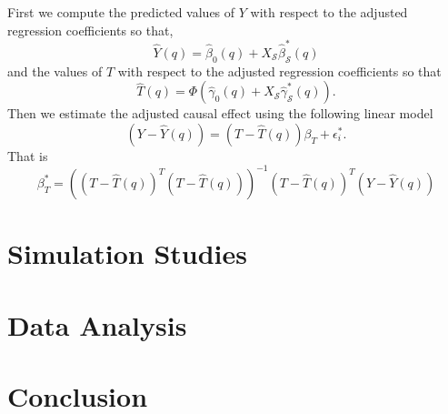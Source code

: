 \documentclass{amsart}
\begin{document}
First we compute the predicted values of $Y$ with respect to
the adjusted regression coefficients so that,
\begin{equation}
\hat{Y}(q) 
= \hat{\beta}_0(q) + X_{\mathcal{S}}\hat{\beta}^*_{\mathcal{S}}(q)
\end{equation}
and the values of $T$ with respect to the adjusted
regression coefficients so that
\begin{equation}
\hat{T}(q) 
= \Phi\left(\hat{\gamma}_0(q) + X_{\mathcal{S}}\hat{\gamma}^*_{\mathcal{S}}(q)\right).
\end{equation}
Then we estimate the adjusted causal effect using the following linear
model
\begin{equation}
\left(Y-\hat{Y}(q)\right) = \left(T - \hat{T}(q)\right)\beta_{T} + \epsilon^*_i.
\end{equation}
That is 
\begin{equation}
\beta_{T}^* = \left(\left(T - \hat{T}(q)\right)^T\left(T - \hat{T}(q)\right)\right)^{-1}\left(T - \hat{T}(q)\right)^T\left(Y-\hat{Y}(q)\right)
\end{equation}

\fi


\section{Simulation Studies}\label{sec:sim}

\section{Data Analysis}\label{sec:data:analysis}

\section{Conclusion}\label{sec:conc}



\end{document}
